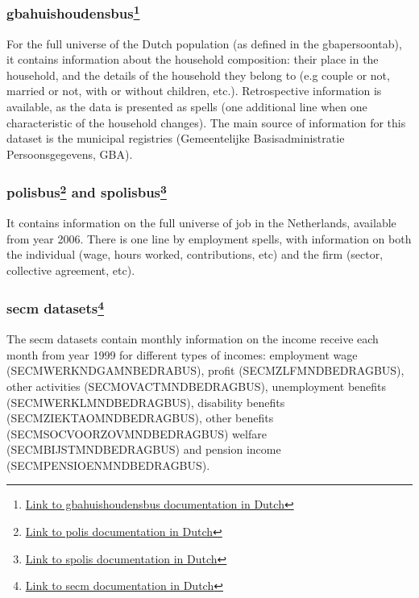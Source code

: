 \documentclass[12pt,a4paper]{article}
\begin{document}
\subsubsection*{gbahuishoudensbus\footnote{\hyperlink{ https://www.cbs.nl/nl-nl/onze-diensten/maatwerk-en-microdata/microdata-zelf-onderzoek-doen/microdatabestanden/gbahuishoudensbus-huishoudenskenmerken}{Link to gbahuishoudensbus documentation in Dutch}}}

For the full universe of the Dutch population (as defined in the gbapersoontab), it contains information about the household composition: their place in the household, and the details of the household they belong to (e.g couple or not, married or not, with or without children, etc.). Retrospective information is available, as the data is presented as spells (one additional line when one characteristic of the household changes). The main source of information for this dataset is the municipal registries (Gemeentelijke Basisadministratie Persoonsgegevens, GBA).

\subsubsection*{polisbus\footnote{\hyperlink{ https://www.cbs.nl/nl-nl/onze-diensten/maatwerk-en-microdata/microdata-zelf-onderzoek-doen/microdatabestanden/polisbus-polisbus-banen-en-lonen-van-werknemers-in-nederland--opvolger-van-ewl-vanaf-2010-vervangen-door-spolisbus--}{Link to polis documentation in Dutch}} and spolisbus\footnote{\hyperlink{ https://www.cbs.nl/nl-nl/onze-diensten/maatwerk-en-microdata/microdata-zelf-onderzoek-doen/microdatabestanden/spolisbus-banen-en-lonen-volgens-polisadministratie}{Link to spolis documentation in Dutch}}}

It contains information on the full universe of job in the Netherlands, available from year 2006. There is one line by employment spells, with information on both the individual (wage, hours worked, contributions, etc) and the firm (sector, collective agreement, etc). 

\subsubsection*{secm datasets\footnote{\hyperlink{https://www.cbs.nl/nl-nl/onze-diensten/maatwerk-en-microdata/microdata-zelf-onderzoek-doen/microdatabestanden/secmbus-personen-sociaaleconomische-categorie
		}{Link to secm documentation in Dutch}}}

The secm datasets contain monthly information on the income receive each month from year 1999 for different types of incomes: employment wage (SECMWERKNDGAMNBEDRABUS), profit (SECMZLFMNDBEDRAGBUS), other activities (SECMOVACTMNDBEDRAGBUS), unemployment benefits (SECMWERKLMNDBEDRAGBUS), disability benefits (SECMZIEKTAOMNDBEDRAGBUS), other benefits (SECMSOCVOORZOVMNDBEDRAGBUS) welfare (SECMBIJSTMNDBEDRAGBUS) and pension income (SECMPENSIOENMNDBEDRAGBUS). 
\end{document}
